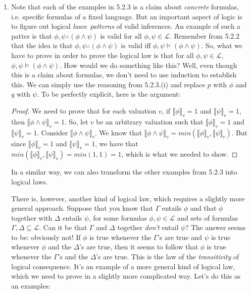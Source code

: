 \begin{enumerate}[\thesection.1]
\begin{enumerate}[(i)]
\begin{proof}
			\end{proof}		
		
		\end{enumerate}
		
		\item Note that each of the examples in 5.2.3 is a claim about \emph{concrete} formulas, i.e. specific formulas of a fixed language. But an important aspect of logic is to figure out logical \emph{laws}: \emph{patterns} of valid inferences. An example of such a patter is that $\phi,\psi\therefore(\phi\land\psi)$ is valid for all $\phi,\psi\in\mathcal{L}$. Remember from 5.2.2 that the idea is that $\phi,\psi\therefore(\phi\land\psi)$ is valid iff $\phi,\psi\vDash (\phi\land\psi)$. So, what we have to prove in order to prove the logical law is that for all $\phi,\psi\in\mathcal{L}$, $\phi,\psi\vDash(\phi\land\psi)$. How would we do something like this? Well, even though this is a claim about formulas, we don't need to use induction to establish this. We can simply use the reasoning from 5.2.3.(i) and replace $p$ with $\phi$ and $q$ with $\psi$. To be perfectly explicit, here is the argument:
			\begin{proof}We need to prove that for each valuation $v$, if $\llbracket \phi\rrbracket_v=1$ and $\llbracket \psi\rrbracket_v=1$, then $\llbracket \phi\land \psi\rrbracket_v=1$. So, let $v$ be an arbitrary valuation such that $\llbracket \phi\rrbracket_v=1$ and $\llbracket \psi\rrbracket_v=1$. Consider $\llbracket \phi\land \psi\rrbracket_v$. We know that $\llbracket \phi\land \psi\rrbracket_v=min(\llbracket \phi\rrbracket_v, \llbracket \psi\rrbracket_v)$. But since $\llbracket \phi\rrbracket_v=1$ and $\llbracket \psi\rrbracket_v=1$, we have that $min(\llbracket \phi\rrbracket_v, \llbracket \psi\rrbracket_v)=min(1,1)=1$, which is what we needed to show.
			\end{proof}
In a similar way, we can also transform the other examples from 5.2.3 into logical laws. 

There is, however, another kind of logical law, which requires a slightly more general approach. Suppose that you know that $\Gamma$ entails $\phi$ and that $\phi$ together with $\Delta$ entails $\psi$, for some formulas $\phi,\psi\in\mathcal{L}$ and sets of formulas $\Gamma,\Delta\subseteq\mathcal{L}$. Can it be that $\Gamma$ and $\Delta$ together \emph{don't} entail $\psi$? The answer seems to be: obviously not! If $\phi$ is true whenever the $\Gamma$'s are true and $\psi$ is true whenever $\phi$ and the $\Delta$'s are true, then it seems to follow that $\phi$ is true whenever the $\Gamma$'s and the $\Delta$'s are true. This is the law of the \emph{transitivity} of logical consequence. It's an example of a more general kind of logical law, which we need to prove in a slightly more complicated way. Let's do this as an examples:
		

\end{enumerate}
